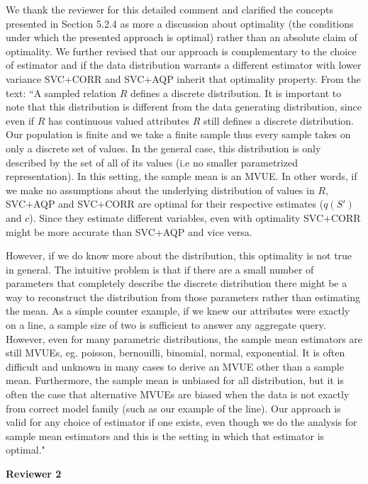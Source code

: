 We thank the reviewer for this detailed comment and clarified the concepts presented in Section 5.2.4 as more a discussion about optimality (the conditions under which the presented approach is optimal) rather than an absolute claim of optimality. We further revised that our approach is complementary to the choice of estimator and if the data distribution warrants a different estimator with lower variance SVC+CORR and SVC+AQP inherit that optimality property. From the text:  
``A sampled relation $R$ defines a discrete distribution. It is important to note that this distribution is different from the data generating distribution, since even if $R$ has continuous valued attributes $R$ still defines a discrete distribution. Our population is finite and we take a finite sample thus every sample takes on only a discrete set of values. In the general case, this distribution is only described by the set of all of its values (i.e no smaller parametrized representation). In this setting, the sample mean is an MVUE. In other words, if we make no assumptions about the underlying distribution of values in $R$, SVC+AQP and SVC+CORR are optimal for their respective estimates ($q(S')$ and $c$). Since they estimate different variables, even with optimality SVC+CORR might be more accurate than SVC+AQP and vice versa. 

However, if we do know more about the distribution, this optimality is not true in general. The intuitive problem is that if there are a small number of parameters that completely describe the discrete distribution there might be a way to reconstruct the distribution from those parameters rather than estimating the mean. As a simple counter example, if we knew our attributes were exactly on a line, a sample size of two is sufficient to answer any aggregate query. However, even for many parametric distributions, the sample mean estimators are still MVUEs, eg. poisson, bernouilli, binomial, normal, exponential. It is often difficult and unknown in many cases to derive an MVUE other than a sample mean. Furthermore, the sample mean is unbiased for all distribution, but it is often the case that alternative MVUEs are biased when the data is not exactly from correct model family (such as our example of the line). Our approach is valid for any choice of estimator if one exists, even though we do the analysis for sample mean estimators and this is the setting in which that estimator is optimal."

\vspace{1em}
\noindent\textbf{Reviewer 2}

